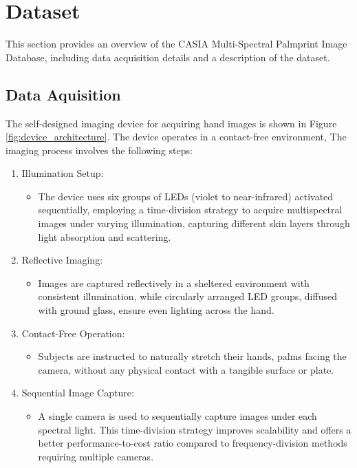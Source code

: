 \section{Dataset}
This section provides an overview of the CASIA Multi-Spectral Palmprint Image Database, including data acquisition details and a description of the dataset.

\subsection{Data Aquisition}

The self-designed imaging device for acquiring hand images \cite{hao2008multispectral,hao2007comparative} is shown in Figure \ref{fig:device_architecture}. The device operates in a contact-free environment, The imaging process involves the following steps:

\begin{enumerate}
    \item Illumination Setup:
        \begin{itemize}
            \item The device uses six groups of LEDs (violet to near-infrared) activated sequentially, employing a time-division strategy to acquire multispectral images under varying illumination, capturing different skin layers through light absorption and scattering. 
        \end{itemize}
    \item Reflective Imaging:
        \begin{itemize}
            \item Images are captured reflectively in a sheltered environment with consistent illumination, while circularly arranged LED groups, diffused with ground glass, ensure even lighting across the hand. 
        \end{itemize}
    \item Contact-Free Operation:
        \begin{itemize}
            \item Subjects are instructed to naturally stretch their hands, palms facing the camera, without any physical contact with a tangible surface or plate. 
        \end{itemize}
    \item Sequential Image Capture:
        \begin{itemize}
            \item A single camera is used to sequentially capture images under each spectral light. This time-division strategy improves scalability and offers a better performance-to-cost ratio compared to frequency-division methods requiring multiple cameras.
        \end{itemize}
\end{enumerate}


